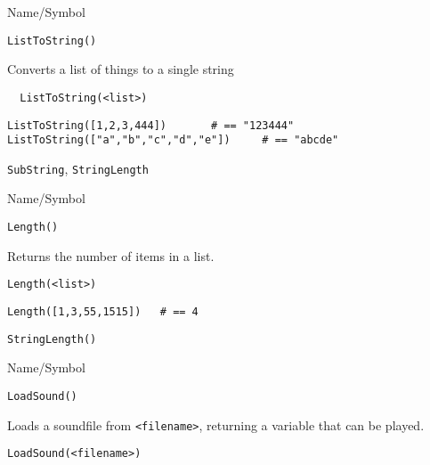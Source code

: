  
\begin{desc}{Name/Symbol}
\item[Name/Symbol]	\verb+ListToString()+

\item[Description]	Converts a list of things to a single string

\item[Usage]
\begin{verbatim}
  ListToString(<list>)
\end{verbatim}

\item[Example]
\begin{verbatim}
ListToString([1,2,3,444])		# == "123444"
ListToString(["a","b","c","d","e"])		# == "abcde"

\end{verbatim}

\item[See Also] \verb+SubString+, \verb+StringLength+
\end{desc}

\rl


\begin{desc}{Name/Symbol}
\item[Name/Symbol]	\verb+Length()+

\item[Description]	Returns the number of items in a list.

\item[Usage]
\begin{verbatim}
Length(<list>)
\end{verbatim}

\item[Example]
\begin{verbatim}
Length([1,3,55,1515])	# == 4
\end{verbatim}

\item[See Also]	\verb+StringLength()+
\end{desc}

\rl



\begin{desc}{Name/Symbol}
\item[Name/Symbol]	\verb+LoadSound()+

\item[Description]	Loads a soundfile from \verb+<filename>+, 
		returning a variable that can be played.

\item[Usage]
\begin{verbatim}
LoadSound(<filename>)
\end{verbatim}

\item[Example]	

\item[See Also]	
\end{desc}

